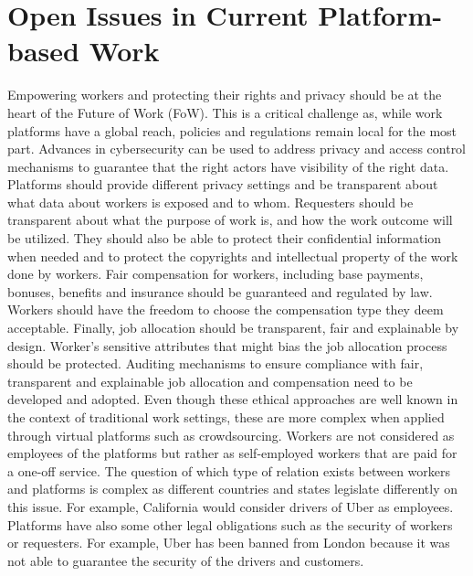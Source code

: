 \documentclass[11pt]{article}
\begin{document}
\section{Open Issues in Current Platform-based Work}
Empowering workers and protecting their rights and privacy should be at the heart of the Future of Work (FoW). This is a critical challenge as, while work platforms have a global reach, policies and regulations remain local for the most part. Advances in cybersecurity can be used to address privacy and access control mechanisms to guarantee that the right actors have visibility of the right data.
Platforms should provide different privacy settings and be transparent about what  data about workers is exposed and to whom. Requesters should be transparent about what the purpose of work is, and how the work  outcome will be utilized. They should also be able to protect their confidential information when needed and to protect the copyrights and intellectual property of the work done by workers. Fair compensation for workers, including base payments, bonuses, benefits and insurance should be guaranteed and regulated by law. 
Workers should have the freedom to choose the compensation type they deem acceptable. Finally, job allocation should be transparent, fair and explainable by design. Worker’s sensitive attributes that might bias the job allocation process should be protected. Auditing mechanisms to ensure compliance with fair, transparent and explainable job allocation and compensation need to be developed and adopted. Even though these ethical approaches are well known in the context of traditional work settings, these are more complex when applied through virtual platforms such as crowdsourcing. Workers are not considered as employees of the platforms but rather as self-employed workers that are paid for a one-off service. The question of which type of relation exists between workers and platforms is complex as different countries and states legislate differently on this issue. For example, California would consider drivers of Uber as employees. Platforms have also some other legal obligations such as the security of workers or requesters. For example, Uber has been banned from London because it was not able to guarantee the security of the drivers and customers. 
\end{document}
